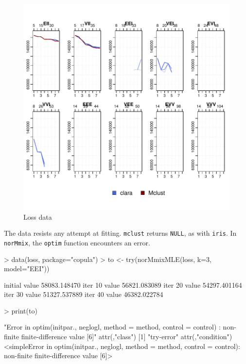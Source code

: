 \begin{figure}[h!]
    \begin{Rgraph}[0.9]
\includegraphics{chapter3-figloss}
    \caption{Loss data}
    \label{fig:loss}
    \end{Rgraph}
\end{figure}

The data resists any attempt at fitting. {\tt mclust} returns {\tt NULL}, as 
with {\tt iris}. In {\tt norMmix}, the {\tt optim} function encounters an error.

\begin{Schunk}
\begin{Sinput}
>     data(loss, package="copula")
>     to <- try(norMmixMLE(loss, k=3, model="EEI"))
\end{Sinput}
\begin{Soutput}
initial  value 58083.148470 
iter  10 value 56821.083089
iter  20 value 54297.401164
iter  30 value 51327.537889
iter  40 value 46382.022784
\end{Soutput}
\begin{Sinput}
>     print(to)
\end{Sinput}
\begin{Soutput}
[1] "Error in optim(initpar., neglogl, method = method, control = control) : \n  non-finite finite-difference value [6]\n"
attr(,"class")
[1] "try-error"
attr(,"condition")
<simpleError in optim(initpar., neglogl, method = method, control = control): non-finite finite-difference value [6]>
\end{Soutput}
\end{Schunk}

